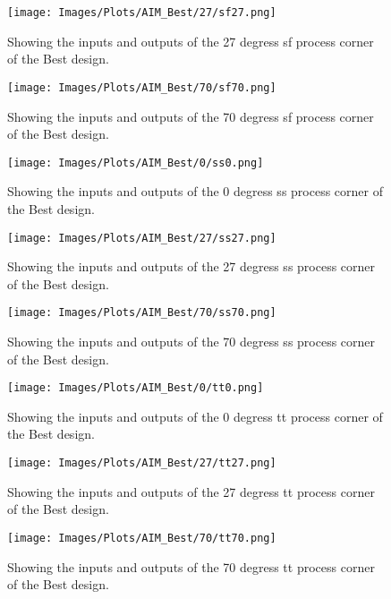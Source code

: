 \begin{figure}[htb] 
    \centering
    \texttt{[image: Images/Plots/AIM\_Best/27/sf27.png]} 
    \caption{Showing the inputs and outputs of the 27 degress sf process corner of the Best design.} 
    \label{fig:27sfBest} 
\end{figure}
\newline
\begin{figure}[htb] 
    \centering
    \texttt{[image: Images/Plots/AIM\_Best/70/sf70.png]} 
    \caption{Showing the inputs and outputs of the 70 degress sf process corner of the Best design.} 
    \label{fig:70sfBest} 
\end{figure}
\begin{figure}[htb] 
    \centering
    \texttt{[image: Images/Plots/AIM\_Best/0/ss0.png]} 
    \caption{Showing the inputs and outputs of the 0 degress ss process corner of the Best design.} 
    \label{fig:0ssBest} 
\end{figure}
\newline
\begin{figure}[htb] 
    \centering
    \texttt{[image: Images/Plots/AIM\_Best/27/ss27.png]} 
    \caption{Showing the inputs and outputs of the 27 degress ss process corner of the Best design.} 
    \label{fig:27ssBest} 
\end{figure}
\begin{figure}[htb] 
    \centering
    \texttt{[image: Images/Plots/AIM\_Best/70/ss70.png]} 
    \caption{Showing the inputs and outputs of the 70 degress ss process corner of the Best design.} 
    \label{fig:70ssBest} 
\end{figure}
\newline
\begin{figure}[htb] 
    \centering
    \texttt{[image: Images/Plots/AIM\_Best/0/tt0.png]} 
    \caption{Showing the inputs and outputs of the 0 degress tt process corner of the Best design.} 
    \label{fig:0ttBest} 
\end{figure}
\begin{figure}[htb] 
    \centering
    \texttt{[image: Images/Plots/AIM\_Best/27/tt27.png]} 
    \caption{Showing the inputs and outputs of the 27 degress tt process corner of the Best design.} 
    \label{fig:27ttBest} 
\end{figure}
\newline
\begin{figure}[htb] 
    \centering
    \texttt{[image: Images/Plots/AIM\_Best/70/tt70.png]} 
    \caption{Showing the inputs and outputs of the 70 degress tt process corner of the Best design.} 
    \label{fig:70ttBest} 
\end{figure}
